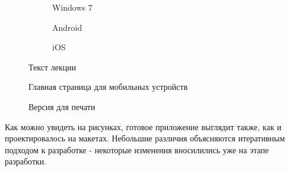 \begin{figure}
	\begin{subfigure}
		\caption{Windows 7}
	\end{subfigure}
	\begin{subfigure}
		\caption{Android}
	\end{subfigure}
	\begin{subfigure}
		\caption{iOS}
	\end{subfigure}
	\caption{Текст лекции}
\end{figure}

\begin{figure}
	\caption{Главная страница для мобильных устройств}
\end{figure}

\begin{figure}
	\caption{Версия для печати}
\end{figure}

Как можно увидеть на рисунках, готовое приложение выглядит также, как и проектировалось на макетах. Небольшие различия объясняются итеративным подходом к разработке - некоторые изменения вносилились уже на этапе разработки.